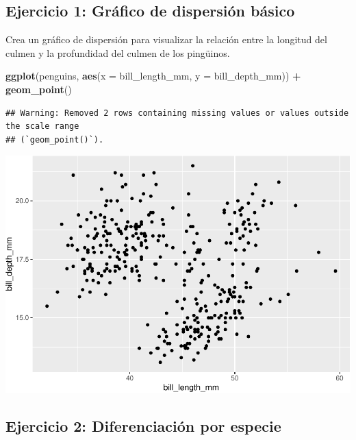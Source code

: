 \documentclass[
]{book}
\newenvironment{Shaded}{\begin{snugshade}}{\end{snugshade}}
\newcommand{\AttributeTok}[1]{\textcolor[rgb]{0.13,0.29,0.53}{#1}}
\newcommand{\FunctionTok}[1]{\textcolor[rgb]{0.13,0.29,0.53}{\textbf{#1}}}
\newcommand{\NormalTok}[1]{#1}
\newcommand{\SpecialCharTok}[1]{\textcolor[rgb]{0.81,0.36,0.00}{\textbf{#1}}}
\begin{document}
\hypertarget{ejercicio-1-gruxe1fico-de-dispersiuxf3n-buxe1sico-1}{%
\subsection{Ejercicio 1: Gráfico de dispersión básico}\label{ejercicio-1-gruxe1fico-de-dispersiuxf3n-buxe1sico-1}}

Crea un gráfico de dispersión para visualizar la relación entre la longitud del culmen y la profundidad del culmen de los pingüinos.

\begin{Shaded}
\begin{Highlighting}[]
\FunctionTok{ggplot}\NormalTok{(penguins, }\FunctionTok{aes}\NormalTok{(}\AttributeTok{x =}\NormalTok{ bill\_length\_mm, }\AttributeTok{y =}\NormalTok{ bill\_depth\_mm)) }\SpecialCharTok{+}
  \FunctionTok{geom\_point}\NormalTok{()}
\end{Highlighting}
\end{Shaded}

\begin{verbatim}
## Warning: Removed 2 rows containing missing values or values outside the scale range
## (`geom_point()`).
\end{verbatim}

\includegraphics{bookdown-demo_files/figure-latex/unnamed-chunk-200-1.pdf}

\hypertarget{ejercicio-2-diferenciaciuxf3n-por-especie-1}{%
\subsection{Ejercicio 2: Diferenciación por especie}\label{ejercicio-2-diferenciaciuxf3n-por-especie-1}}
\end{document}
